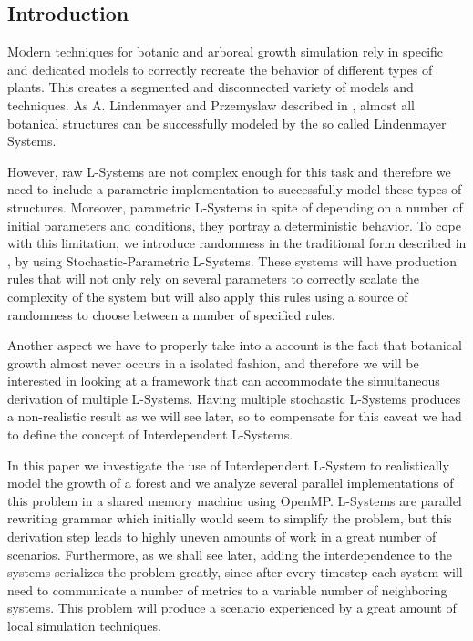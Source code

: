 \documentclass[letterpaper,twoside,11pt]{article}
\begin{document}
\begin{multicols}{2} %

\section{Introduction}
\lettrine[nindent=0em,lines=2]{M}
odern techniques for botanic and arboreal growth simulation rely in specific and dedicated models to correctly recreate the behavior of different types of plants. This creates a segmented and disconnected variety of models and techniques. As A. Lindenmayer and Przemyslaw described in \cite{Prusinkiewicz:1996:ABP:235579}, almost all botanical structures can be successfully modeled by the so called Lindenmayer Systems.

However, raw L-Systems are not complex enough for this task and therefore we need to include a parametric implementation to successfully model these types of structures. Moreover, parametric L-Systems in spite of depending on a number of initial parameters and conditions, they portray a deterministic behavior. To cope with this limitation, we introduce randomness in the traditional form described in \cite{Prusinkiewicz:1996:ABP:235579}, by using Stochastic-Parametric L-Systems. These systems will have production rules that will not only rely on several parameters to correctly scalate the complexity of the system but will also apply this rules using a source of randomness to choose between a number of specified rules.

Another aspect we have to properly take into a account is the fact that botanical growth almost never occurs in a isolated fashion, and therefore we will be interested in looking at a framework that can accommodate the simultaneous derivation of multiple L-Systems. Having multiple stochastic L-Systems produces a non-realistic result as we will see later, so to compensate for this caveat we had to define the concept of Interdependent L-Systems.

In this paper we investigate the use of Interdependent L-System to realistically model the growth of a forest and we analyze several parallel implementations of this problem in a shared memory machine using OpenMP. L-Systems are parallel rewriting grammar which initially would seem to simplify the problem, but this derivation step leads to highly uneven amounts of work in a great number of scenarios. Furthermore, as we shall see later, adding the interdependence to the systems serializes the problem greatly, since after every timestep each system will need to communicate a number of metrics to a variable number of neighboring systems. This problem will produce a scenario experienced by a great amount of local simulation techniques.


\end{multicols}
\end{document}
